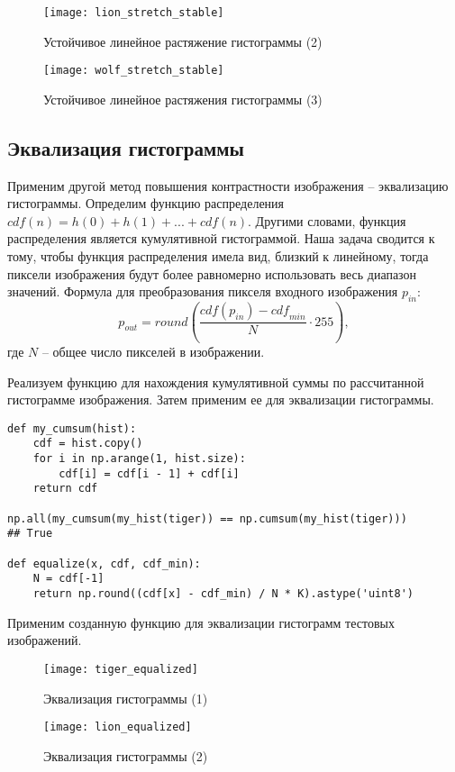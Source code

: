 \begin{figure}[H]
	\centering
	\texttt{[image: lion\_stretch\_stable]}
	\caption{Устойчивое линейное растяжение гистограммы (2)}
\end{figure}

\begin{figure}[H]
	\centering
	\texttt{[image: wolf\_stretch\_stable]}
	\caption{Устойчивое линейное растяжения гистограммы (3)}
\end{figure}

\subsection{Эквализация гистограммы}

Применим другой метод повышения контрастности изображения -- эквализацию гистограммы. Определим функцию распределения $\mathit{cdf}(n) = h(0) + h(1) + ... + \mathit{cdf}(n)$. Другими словами, функция распределения является кумулятивной гистограммой. Наша задача сводится к тому, чтобы функция распределения имела вид, близкий к линейному, тогда пиксели изображения будут более равномерно использовать весь диапазон значений. Формула для преобразования пикселя входного изображения $p_{in}$:
$$
p_{out} = \mathit{round} \left( \frac{\mathit{cdf}(p_{in}) - \mathit{cdf}_{min}}{N} \cdot 255 \right),
$$
где $N$ -- общее число пикселей в изображении.

Реализуем функцию для нахождения кумулятивной суммы по рассчитанной гистограмме изображения. Затем применим ее для эквализации гистограммы.

\begin{lstlisting}
def my_cumsum(hist):
	cdf = hist.copy()
	for i in np.arange(1, hist.size):
		cdf[i] = cdf[i - 1] + cdf[i]
	return cdf

np.all(my_cumsum(my_hist(tiger)) == np.cumsum(my_hist(tiger)))
## True

def equalize(x, cdf, cdf_min):
	N = cdf[-1]
	return np.round((cdf[x] - cdf_min) / N * K).astype('uint8')
\end{lstlisting}

Применим созданную функцию для эквализации гистограмм тестовых изображений.

\begin{figure}[H]
	\centering
	\texttt{[image: tiger\_equalized]}
	\caption{Эквализация гистограммы (1)}
\end{figure}

\begin{figure}[H]
	\centering
	\texttt{[image: lion\_equalized]}
	\caption{Эквализация гистограммы (2)}
\end{figure}


